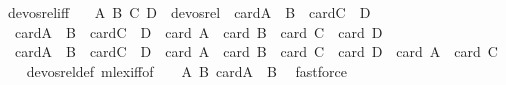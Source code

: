 \begin{isabellebody}
\isadelimdocument
%
\endisadelimdocument
%
\isatagdocument
%
\isamarkuptrue%
%
\endisatagdocument
{\isafolddocument}%
%
\isadelimdocument
%
\endisadelimdocument
{}\isamarkupfalse%
\ devos{\isacharunderscore}{\kern0pt}rel{\isacharunderscore}{\kern0pt}iff{\isacharcolon}{\kern0pt}\ \isanewline
\ \ {\isachardoublequoteopen}{\isacharparenleft}{\kern0pt}{\isacharparenleft}{\kern0pt}A{\isacharcomma}{\kern0pt}\ B{\isacharparenright}{\kern0pt}{\isacharcomma}{\kern0pt}\ {\isacharparenleft}{\kern0pt}C{\isacharcomma}{\kern0pt}\ D{\isacharparenright}{\kern0pt}{\isacharparenright}{\kern0pt}\ {\isasymin}\ devos{\isacharunderscore}{\kern0pt}rel\ {\isasymlongleftrightarrow}\ card{\isacharparenleft}{\kern0pt}A\ {\isasymcdots}\ B{\isacharparenright}{\kern0pt}\ {\isacharless}{\kern0pt}\ card{\isacharparenleft}{\kern0pt}C\ {\isasymcdots}\ D{\isacharparenright}{\kern0pt}\ {\isasymor}\ \isanewline
\ \ {\isacharparenleft}{\kern0pt}card{\isacharparenleft}{\kern0pt}A\ {\isasymcdots}\ B{\isacharparenright}{\kern0pt}\ {\isacharequal}{\kern0pt}\ card{\isacharparenleft}{\kern0pt}C\ {\isasymcdots}\ D{\isacharparenright}{\kern0pt}\ {\isasymand}\ card\ A\ {\isacharplus}{\kern0pt}\ card\ B\ {\isachargreater}{\kern0pt}\ card\ C\ {\isacharplus}{\kern0pt}\ card\ D{\isacharparenright}{\kern0pt}\ {\isasymor}\isanewline
\ \ {\isacharparenleft}{\kern0pt}card{\isacharparenleft}{\kern0pt}A\ {\isasymcdots}\ B{\isacharparenright}{\kern0pt}\ {\isacharequal}{\kern0pt}\ card{\isacharparenleft}{\kern0pt}C\ {\isasymcdots}\ D{\isacharparenright}{\kern0pt}\ {\isasymand}\ card\ A\ {\isacharplus}{\kern0pt}\ card\ B\ {\isacharequal}{\kern0pt}\ card\ C\ {\isacharplus}{\kern0pt}\ card\ D\ {\isasymand}\ card\ A\ {\isacharless}{\kern0pt}\ card\ C{\isacharparenright}{\kern0pt}{\isachardoublequoteclose}\isanewline
%
\isadelimproof
\ \ %
\endisadelimproof
%
\isatagproof
{}\isamarkupfalse%
\ devos{\isacharunderscore}{\kern0pt}rel{\isacharunderscore}{\kern0pt}def\ mlex{\isacharunderscore}{\kern0pt}iff{\isacharbrackleft}{\kern0pt}of\ {\isacharunderscore}{\kern0pt}\ {\isacharunderscore}{\kern0pt}\ {\isachardoublequoteopen}{\isasymlambda}\ {\isacharparenleft}{\kern0pt}A{\isacharcomma}{\kern0pt}\ B{\isacharparenright}{\kern0pt}{\isachardot}{\kern0pt}\ card{\isacharparenleft}{\kern0pt}A\ {\isasymcdots}\ B{\isacharparenright}{\kern0pt}{\isachardoublequoteclose}{\isacharbrackright}{\kern0pt}\ \isamarkupfalse%
\ fastforce%
\endisatagproof
{\isafoldproof}%
%
\isadelimproof
\isanewline
%

\end{isabellebody}
